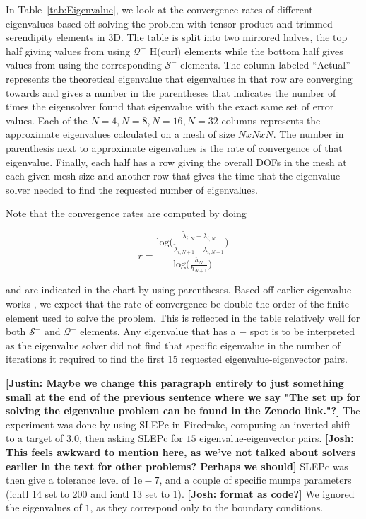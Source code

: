 \documentclass[manuscript,screen]{acmart}
\newcommand\josh[1]{\textbf{\textcolor[rgb]{0,.5,1}{[Josh: #1]}}}
\newcommand\justin[1]{\textbf{\textcolor[rgb]{0,1,0.5}{[Justin: #1]}}}
\begin{document}
In Table~\ref{tab:Eigenvalue}, we look at the convergence rates of different eigenvalues based off solving the problem with tensor product and trimmed serendipity elements in 3D.  The table is split into two mirrored halves, the top half giving values from using $\mathcal{Q}^-$ H$($curl$)$ elements while the bottom half gives values from using the corresponding $\mathcal{S}^-$ elements.  The column labeled ``Actual'' represents the theoretical eigenvalue that eigenvalues in that row are converging towards and gives a number in the parentheses that indicates the number of times the eigensolver found that eigenvalue with the exact same set of error values. Each of the $N=4, N=8, N=16, N=32$ columns represents the approximate eigenvalues calculated on a mesh of size $N x N x N$.  The number in parenthesis next to approximate eigenvalues is the rate of convergence of that eigenvalue.  Finally, each half has a row giving the overall DOFs in the mesh at each given mesh size and another row that gives the time that the eigenvalue solver needed to find the requested number of eigenvalues.


Note that the convergence rates are computed by doing

\[r = \frac{\text{log}\bigg(\frac{\tilde{\lambda}_{i,N} - \lambda_{i,N}}{\tilde{\lambda}_{i,N+1} - \lambda_{i,N+1}} \bigg)}{\text{log}\bigg( \frac{h_N}{h_{N+1}} \bigg)} \]

\noindent and are indicated in the chart by using parentheses.  Based off earlier eigenvalue works \cite{boffi2010finite}, we expect that the rate of convergence be double the order of the finite element used to solve the problem.  This is reflected in the table relatively well for both $\mathcal{S}^-$ and $\mathcal{Q}^-$ elements.  Any eigenvalue that has a $-$ spot is to be interpreted as the eigenvalue solver did not find that specific eigenvalue in the number of iterations it required to find the first 15 requested eigenvalue-eigenvector pairs.


\justin{Maybe we change this paragraph entirely to just something small at the end of the previous sentence where we say "The set up for solving the eigenvalue problem can be found in the Zenodo link."?}
The experiment was done by using SLEPc in Firedrake, computing an inverted shift to a target of $3.0$, then asking SLEPc for $15$ eigenvalue-eigenvector pairs.  \josh{This feels awkward to mention here, as we've not talked about solvers earlier in the text for other problems?  Perhaps we should}   SLEPc was then give a tolerance level of $1\text{e}-7$, and a couple of specific mumps parameters (icntl 14 set to 200 and icntl 13 set to 1).  \josh{format as code?} We ignored the eigenvalues of $1$, as they correspond only to the boundary conditions. 
\end{document}
